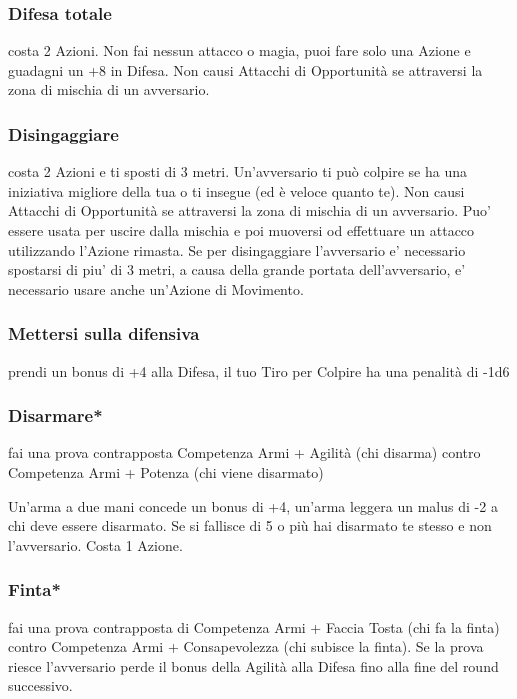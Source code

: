 \documentclass[a4paper,11pt,twoside,openany]{book}
\begin{document}
\subsubsection{Difesa totale} costa 2 Azioni. Non fai nessun attacco o magia, puoi fare solo una Azione e guadagni un +8 in Difesa. Non causi Attacchi di Opportunità se attraversi la zona di mischia di un avversario.

\subsubsection{Disingaggiare} costa 2 Azioni e ti sposti di 3 metri. Un'avversario ti può colpire se ha una iniziativa migliore della tua o ti insegue (ed è veloce quanto te). Non causi Attacchi di Opportunità se attraversi la zona di mischia di un avversario. Puo' essere usata per uscire dalla mischia e poi muoversi od effettuare un attacco utilizzando l'Azione rimasta.
Se per disingaggiare l'avversario e' necessario spostarsi di piu' di 3 metri, a causa della grande portata dell'avversario, e' necessario usare anche un'Azione di Movimento.

\subsubsection{Mettersi sulla difensiva} prendi un bonus di +4 alla Difesa, il tuo Tiro per Colpire ha una penalità di -1d6

\subsubsection{Disarmare*} fai una prova contrapposta Competenza Armi + Agilità (chi disarma) contro Competenza Armi + Potenza (chi viene disarmato)

Un'arma a due mani concede un bonus di +4, un'arma leggera un malus di -2 a chi deve essere disarmato. Se si fallisce di 5 o più hai disarmato te stesso e non l'avversario. Costa 1 Azione.

\subsubsection{Finta*} fai una prova contrapposta di Competenza Armi + Faccia Tosta (chi fa la finta) contro Competenza Armi + Consapevolezza (chi subisce la finta). Se la prova riesce l'avversario perde il bonus della Agilità alla Difesa fino alla fine del round successivo.
\end{document}
